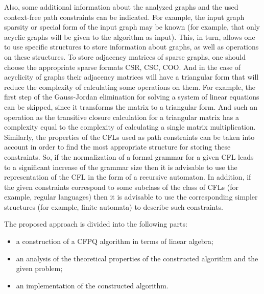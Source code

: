 Also, some additional information about the analyzed graphs and the used context-free path constraints can be indicated. For example, the input graph sparsity or special form of the input graph may be known (for example, that only acyclic graphs will be given to the algorithm as input). This, in turn, allows one to use specific structures to store information about graphs, as well as operations on these structures. To store adjacency matrices of sparse graphs, one should choose the appropriate sparse formats CSR, CSC, COO. And in the case of acyclicity of graphs their adjacency matrices will have a triangular form that will reduce the complexity of calculating some operations on them. For example, the first step of the Gauss-Jordan elimination for solving a system of linear equations can be skipped, since it transforms the matrix to a triangular form. And such an operation as the transitive closure calculation for a triangular matrix has a complexity equal to the complexity of calculating a single matrix multiplication. Similarly, the properties of the CFLs used as path constraints can be taken into account in order to find the most appropriate structure for storing these constraints. So, if the normalization of a formal grammar for a given CFL leads to a significant increase of the grammar size then it is advisable to use the representation of the CFL in the form of a recursive automaton. In addition, if the given constraints correspond to some subclass of the class of CFLs (for example, regular languages) then it is advisable to use the corresponding simpler structures (for example, finite automata) to describe such constraints.

The proposed approach is divided into the following parts:
\begin{itemize}
    \item a construction of a CFPQ algorithm in terms of linear algebra;
    \item an analysis of the theoretical properties of the constructed algorithm and the given problem;
    \item an implementation of the constructed algorithm.
\end{itemize}

